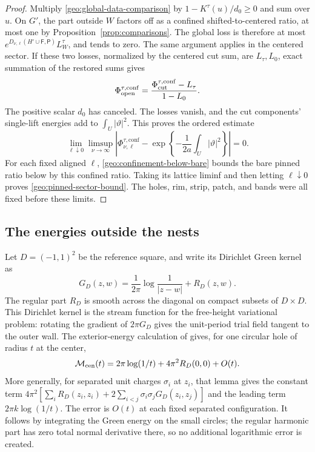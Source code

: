 \begin{proof}
Multiply \eqref{geo:global-data-comparison} by
\(1-K^\tau(u)/d_0\ge0\) and sum over \(u\).  On \(G'\), the part outside
\(W\) factors off as a confined shifted-to-centered ratio, at most one
by Proposition~\ref{prop:comparisons}.  The global loss is therefore
at most \(e^{D_{\nu,\ell}(H'\cup\mathsf F,\mathsf P)}L_W^\tau\), and tends
to zero.  The same argument applies in the centered sector.  If these
two losses, normalized by the centered cut sum, are \(L_\tau,L_0\),
exact summation of the restored sums gives
\[
              \Phi_{\rm open}^{\tau,\mathrm{conf}}
                 =\frac{\Phi_{\rm cut}^{\tau,\mathrm{conf}}-L_\tau}
                        {1-L_0}.
\]
The positive scalar \(d_0\) has canceled.  The losses vanish, and the
cut components' single-lift energies add to \(\int_U|\vartheta|^2\).
This proves the ordered estimate
\[
 \lim_{\ell\downarrow0}\limsup_{\nu\to\infty}
 \left|\Phi^{\tau,\mathrm{conf}}_{\nu,\ell}
 -\exp\left\{-\frac1{2a}\int_U|\vartheta|^2\right\}\right|=0.
\]
For each fixed aligned \(\ell\),
\eqref{geo:confinement-below-bare} bounds the bare pinned ratio below
by this confined ratio.  Taking its lattice liminf and then letting
\(\ell\downarrow0\) proves \eqref{geo:pinned-sector-bound}.
The holes, rim, strip, patch, and bands were all fixed before these limits.
\end{proof}

\subsection{The energies outside the nests}

Let \(D=(-1,1)^2\) be the reference square, and write its Dirichlet
Green kernel as
\[
 G_D(z,w)=\frac1{2\pi}\log\frac1{|z-w|}+R_D(z,w).
\]
The regular part \(R_D\) is smooth across the diagonal on compact
subsets of \(D\times D\).  This Dirichlet kernel is the stream function
for the free-height variational problem: rotating the gradient of
\(2\pi G_D\) gives the unit-period trial field tangent to the outer
wall.  The exterior-energy calculation of \cite[Lemma~6.1]{S} gives,
for one circular hole of radius \(t\) at the center,
\begin{equation}\label{geo:single-energy}
 \mathcal M_{\rm cen}(t)
       =2\pi\log(1/t)+4\pi^2R_D(0,0)+O(t).
\end{equation}
More generally, for separated unit charges \(\sigma_i\) at \(z_i\),
that lemma gives the constant term
\(4\pi^2[\sum_iR_D(z_i,z_i)+2\sum_{i<j}\sigma_i\sigma_jG_D(z_i,z_j)]\)
and the leading term \(2\pi k\log(1/t)\).  The error is \(O(t)\) at
each fixed separated configuration.  It follows by integrating the
Green energy on the small circles; the regular harmonic part has zero
total normal derivative there, so no additional logarithmic error is
created.

